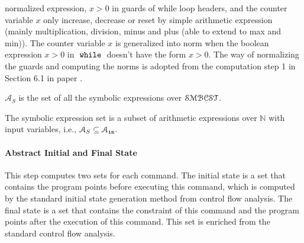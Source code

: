 normalized expression, $x > 0$
in guards of while loop headers, and 
the counter variable $x$ only increase, decrease or reset by 
simple arithmetic expression (mainly multiplication, division, minus and plus (able to extend to max and min)). 
The counter variable $x$ is generalized into norm when the boolean expression $x > 0$
in $\;\mathtt{while}\;$ doesn't have the form $x > 0$.
The way of normalizing the guards and computing the norms is adopted from the computation step 1 in Section 6.1 in paper \cite{sinn2017complexity}. 
\begin{defn}
  $\mathcal{A}_{S}$ is the set of all the symbolic expressions 
over $\mathcal{SMBCST}$.
\end{defn}
The symbolic expression set is a subset of arithmetic expressions over $\mathbb{N}$ with input variables, 
i.e., $\mathcal{A}_{S} \subseteq \mathcal{A}_{\mathtt{in}}$.
\paragraph{Abstract Initial and Final State}
This step computes two sets for each command. 
The initial state is a set that contains the
program points before executing this command, which is computed by the standard initial state generation method from control flow analysis.
The final state is a set
that contains the constraint of this command and the program points after the execution of this command.
This set is enriched 
from the standard control flow analysis.

